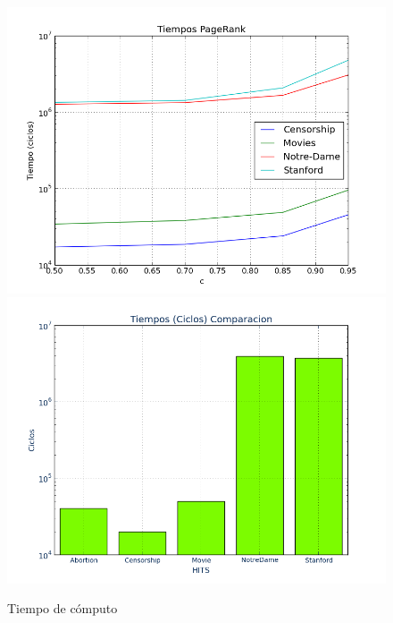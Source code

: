 \documentclass[a4paper]{article}
\begin{document}
\begin{figure}[htbp]
\centering
\includegraphics[scale=0.385]{img/TiemposPage.png}
\includegraphics[scale=0.385]{img/TiemposHits.png}
\caption{Tiempo de cómputo}
\end{figure}
\end{document}
